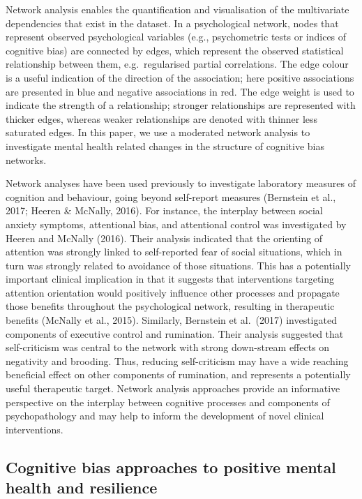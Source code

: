 \documentclass[man,floatsintext]{apa6}
\begin{document}
Network analysis enables the quantification and visualisation of the multivariate dependencies that exist in the dataset. In a psychological network, nodes that represent observed psychological variables (e.g., psychometric tests or indices of cognitive bias) are connected by edges, which represent the observed statistical relationship between them, e.g.~regularised partial correlations. The edge colour is a useful indication of the direction of the association; here positive associations are presented in blue and negative associations in red. The edge weight is used to indicate the strength of a relationship; stronger relationships are represented with thicker edges, whereas weaker relationships are denoted with thinner less saturated edges. In this paper, we use a moderated network analysis to investigate mental health related changes in the structure of cognitive bias networks.

Network analyses have been used previously to investigate laboratory measures of cognition and behaviour, going beyond self-report measures (Bernstein et al., 2017; Heeren \& McNally, 2016). For instance, the interplay between social anxiety symptoms, attentional bias, and attentional control was investigated by Heeren and McNally (2016). Their analysis indicated that the orienting of attention was strongly linked to self-reported fear of social situations, which in turn was strongly related to avoidance of those situations. This has a potentially important clinical implication in that it suggests that interventions targeting attention orientation would positively influence other processes and propagate those benefits throughout the psychological network, resulting in therapeutic benefits (McNally et al., 2015). Similarly, Bernstein et al.~(2017) investigated components of executive control and rumination. Their analysis suggested that self-criticism was central to the network with strong down-stream effects on negativity and brooding. Thus, reducing self-criticism may have a wide reaching beneficial effect on other components of rumination, and represents a potentially useful therapeutic target. Network analysis approaches provide an informative perspective on the interplay between cognitive processes and components of psychopathology and may help to inform the development of novel clinical interventions.

\hypertarget{cognitive-bias-approaches-to-positive-mental-health-and-resilience}{%
\subsection{Cognitive bias approaches to positive mental health and resilience}\label{cognitive-bias-approaches-to-positive-mental-health-and-resilience}}
\end{document}
